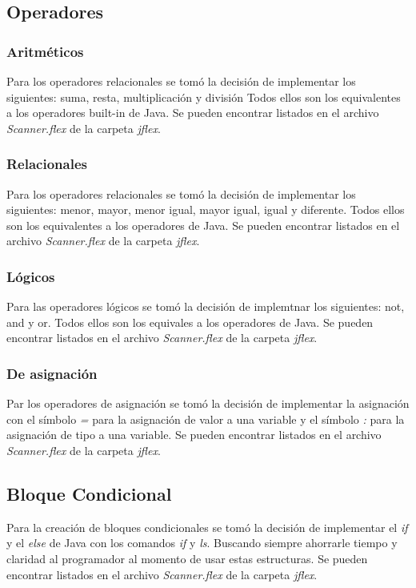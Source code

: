 \documentclass{article}
\begin{document}
\subsection{Operadores}
\subsubsection{Aritméticos}
\par Para los operadores relacionales se tomó la decisión de implementar los siguientes: suma, resta, multiplicación y división Todos ellos son los equivalentes a los operadores built-in de Java. Se pueden encontrar listados en el archivo \textit{Scanner.flex} de la carpeta \textit{jflex}. 
\subsubsection{Relacionales}
\par Para los operadores relacionales se tomó la decisión de implementar los siguientes: menor, mayor, menor igual, mayor igual, igual y diferente. Todos ellos son los equivalentes a los operadores de Java. Se pueden encontrar listados en el archivo \textit{Scanner.flex} de la carpeta \textit{jflex}. 
\subsubsection{Lógicos}
\par Para las operadores lógicos se tomó la decisión de implemtnar los siguientes: not, and y or. Todos ellos son los equivales a los operadores de Java. Se pueden encontrar listados en el archivo \textit{Scanner.flex} de la carpeta \textit{jflex}.
\subsubsection{De asignación}
\par Par los operadores de asignación se tomó la decisión de implementar la asignación con el símbolo \textit{=} para la asignación de valor a una variable y el símbolo \textit{:} para la asignación de tipo a una variable. Se pueden encontrar listados en el archivo \textit{Scanner.flex} de la carpeta \textit{jflex}.
\subsection{Bloque Condicional}
\par Para la creación de bloques condicionales se tomó la decisión de implementar el \textit{if} y el \textit{else} de Java con los comandos \textit{if} y \textit{ls}. Buscando siempre ahorrarle tiempo y claridad al programador al momento de usar estas estructuras. Se pueden encontrar listados en el archivo \textit{Scanner.flex} de la carpeta \textit{jflex}.
\end{document}
